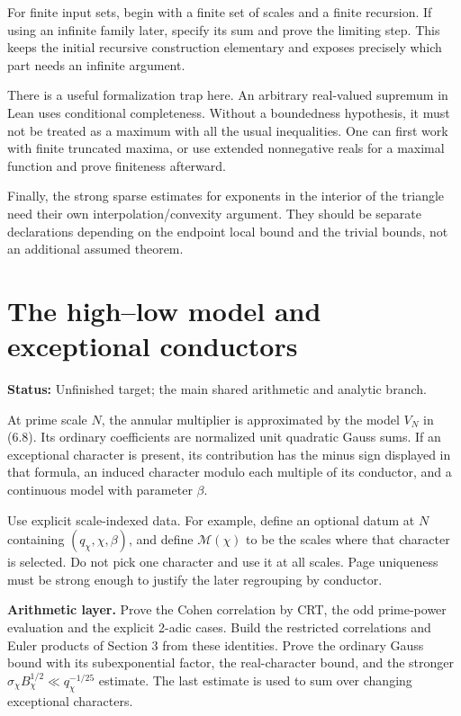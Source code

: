\documentclass[11pt]{article}
\newcommand{\status}[1]{\textbf{Status:} #1.}
\newcommand{\page}{\newpage}
\begin{document}
For finite input sets, begin with a finite set of scales and a finite recursion.
If using an infinite family later, specify its sum and prove the limiting step.
This keeps the initial recursive construction elementary and exposes precisely
which part needs an infinite argument.

There is a useful formalization trap here. An arbitrary real-valued supremum in
Lean uses conditional completeness. Without a boundedness hypothesis, it must
not be treated as a maximum with all the usual inequalities. One can first work
with finite truncated maxima, or use extended nonnegative reals for a maximal
function and prove finiteness afterward.

Finally, the strong sparse estimates for exponents in the interior of the triangle
need their own interpolation/convexity argument. They should be separate
declarations depending on the endpoint local bound and the trivial bounds, not
an additional assumed theorem.

\page
\section{The high--low model and exceptional conductors}
\status{Unfinished target; the main shared arithmetic and analytic branch}

At prime scale \(N\), the annular multiplier is approximated by the model \(V_N\)
in (6.8). Its ordinary coefficients are normalized unit quadratic Gauss sums.
If an exceptional character is present, its contribution has the minus sign
displayed in that formula, an induced character modulo each multiple of its
conductor, and a continuous model with parameter \(\beta\).

Use explicit scale-indexed data. For example, define an optional datum at \(N\)
containing \((q_\chi,\chi,\beta)\), and define
\(\mathcal M(\chi)\) to be the scales where that character is selected. Do not
pick one character and use it at all scales. Page uniqueness must be strong
enough to justify the later regrouping by conductor.

\textbf{Arithmetic layer.} Prove the Cohen correlation by CRT, the odd prime-power
evaluation and the explicit 2-adic cases. Build the restricted correlations and
Euler products of Section 3 from these identities. Prove the ordinary Gauss bound
with its subexponential factor, the real-character bound, and the stronger
\(\sigma_\chi B_\chi^{1/2}\ll q_\chi^{-1/25}\) estimate. The last estimate is used
to sum over changing exceptional characters.
\end{document}
